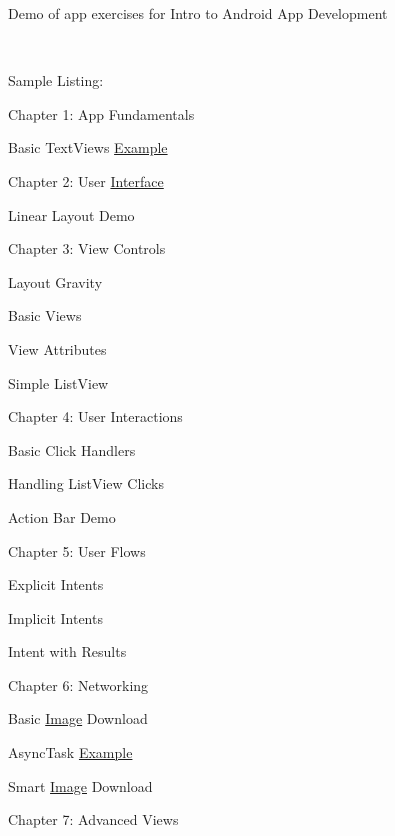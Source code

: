 Demo of app exercises for Intro to Android App Development

~ 

Sample Listing\+:


\begin{DoxyItemize}
\item Chapter 1\+: App Fundamentals
\begin{DoxyItemize}
\item Basic Text\+Views \mbox{\hyperlink{struct_example}{Example}}
\end{DoxyItemize}
\item Chapter 2\+: User \mbox{\hyperlink{class_interface}{Interface}}
\begin{DoxyItemize}
\item Linear Layout Demo
\end{DoxyItemize}
\item Chapter 3\+: View Controls
\begin{DoxyItemize}
\item Layout Gravity
\item Basic Views
\item View Attributes
\item Simple List\+View
\end{DoxyItemize}
\item Chapter 4\+: User Interactions
\begin{DoxyItemize}
\item Basic Click Handlers
\item Handling List\+View Clicks
\item Action Bar Demo
\end{DoxyItemize}
\item Chapter 5\+: User Flows
\begin{DoxyItemize}
\item Explicit Intents
\item Implicit Intents
\item Intent with Results
\end{DoxyItemize}
\item Chapter 6\+: Networking
\begin{DoxyItemize}
\item Basic \mbox{\hyperlink{class_image}{Image}} Download
\item Async\+Task \mbox{\hyperlink{struct_example}{Example}}
\item Smart \mbox{\hyperlink{class_image}{Image}} Download
\end{DoxyItemize}
\item Chapter 7\+: Advanced Views

\end{DoxyItemize}
